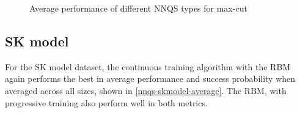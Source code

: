 \begin{figure}[!htb]
    \centering
    \caption{Average performance of different NNQS types for max-cut}
    \label{nnqs-maxcut-average}
\end{figure}

\subsection{SK model}
For the SK model dataset, the continuous training algorithm with the RBM again performs the best in average performance and success probability when averaged across all sizes, shown in \autoref{nnqs-skmodel-average}. The RBM, with progressive training also perform well in both metrics.

